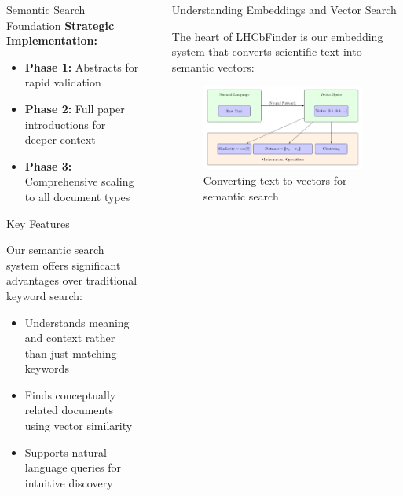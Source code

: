 \documentclass[final]{beamer}
\newlength{\sepwidth}
\newlength{\colwidth}
\newcommand{\separatorcolumn}{\begin{column}{\sepwidth}\end{column}}
\begin{document}
\begin{frame}[t]
\begin{columns}[t]
\begin{column}{\colwidth}
\begin{block}{Semantic Search Foundation}
    \textbf{Strategic Implementation:}
    \begin{itemize}
      \item \textbf{Phase 1:} Abstracts for rapid validation
      \item \textbf{Phase 2:} Full paper introductions for deeper context
      \item \textbf{Phase 3:} Comprehensive scaling to all document types
    \end{itemize}

  \end{block}

  \begin{alertblock}{Key Features}
    
    Our semantic search system offers significant advantages over traditional keyword search:
    
    \begin{itemize}
      \item Understands meaning and context rather than just matching keywords
      \item Finds conceptually related documents using vector similarity
      \item Supports natural language queries for intuitive discovery
    \end{itemize}
    
  \end{alertblock}

\end{column}

\separatorcolumn

\begin{column}{\colwidth}

  \begin{block}{Understanding Embeddings and Vector Search}

    The heart of LHCbFinder is our embedding system that converts scientific text into semantic vectors:

    \begin{figure}
      \centering
      \includegraphics[width=0.95\textwidth]{figure2-embeddings.pdf}
      \caption{Converting text to vectors for semantic search}
    \end{figure}
    

\end{block}
\end{column}
\end{columns}
\end{frame}
\end{document}
